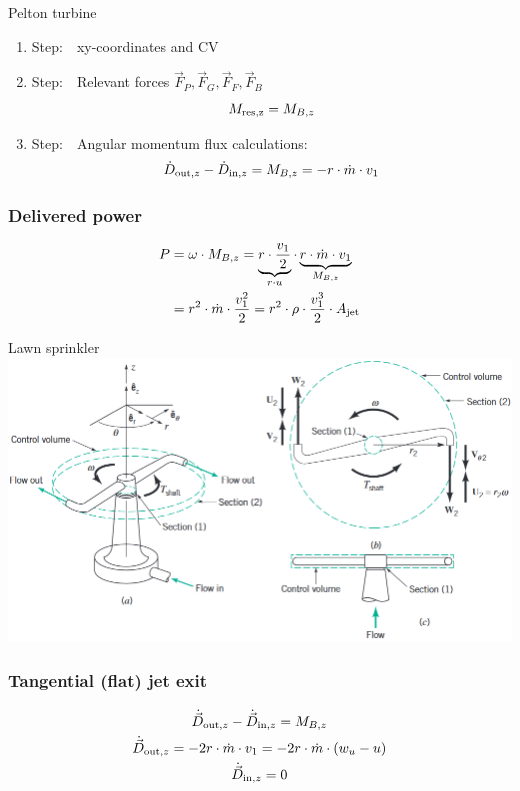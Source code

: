 \documentclass{article}
\begin{document}
\begin{multicols}{2}
\begin{examplebox}{Pelton turbine}
        \begin{enumerate}[label=\Roman*]
        \item Step:\ \ xy-coordinates and CV
        \item Step:\ \ Relevant forces $\vec{F}_P,\vec{F}_G,\vec{F}_F,\vec{F}_B$
            \begin{equation}
                M_{\rm res,z} = M_{B,z}
            \end{equation}
        \item Step:\ \ Angular momentum flux calculations:
            \begin{equation}
                \dot{D}_{{\rm out},z} - \dot{D}_{{\rm in},z} = M_{B,z} = -r\cdot \dot{m} \cdot v_1
            \end{equation}
    \end{enumerate}

    \subsubsection{Delivered power}
    \vspace*{-0.3cm}
    \begin{align}
        P&=\omega\cdot M_{B,z} = \underbrace{r\cdot \frac{v_1}{2}}_{r\cdot u}\cdot \underbrace{r\cdot\dot{m}\cdot v_1}_{M_{B,z}} \notag \\
        &= r^2\cdot\dot{m}\cdot\frac{v_1^2}{2} = r^2\cdot \rho \cdot \frac{v_1^3}{2}\cdot A_{\rm jet}
    \end{align}
\end{examplebox}

\begin{examplebox}{Lawn sprinkler}
    \includegraphics[width=\textwidth]{media/rasensprenger_orig.png}
    \subsubsection{Tangential (flat) jet exit}
    \vspace*{-0.3cm}
    \begin{gather}
        \dot{\vec{D}}_{{\rm out},z} - \dot{\vec{D}}_{{\rm in},z} = M_{B,z} \notag \\
        \dot{\vec{D}}_{{\rm out},z} = -2r\cdot \dot{m}\cdot v_1 = -2r\cdot \dot{m}\cdot \left(w_u - u\right)\\
        \dot{\vec{D}}_{{\rm in},z} = 0
    \end{gather}


\end{examplebox}
\end{multicols}
\end{document}
